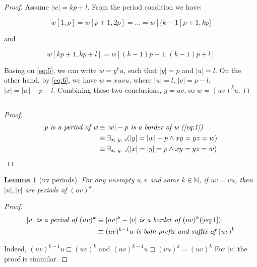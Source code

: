 \documentclass{scrartcl}
\newtheorem{lema}{Lemma}
\begin{document}
  \subsection{}
    \begin{proof}
      Assume $|w| = kp + l$. From the period condition we have:
      
      \begin{equation}\label{eq:5}
        w[1, p] = w[p + 1, 2p] = \dots = w[(k - 1]p + 1, kp]
      \end{equation}
      
      and
      
      \begin{equation}\label{eq:6}
        w[kp + 1, kp + l] = w[(k - 1)p + 1, (k - 1)p + l]
      \end{equation}
      
      Basing on \ref{eq:5}, we can write $w = y^ku$, such that $|y| = p$ and $|u| = l$. On the other hand, by \ref{eq:6}, we have $w = xuvu$, where $|u| = l$, $|v| = p - l$, $|x| = |w| - p - l$. Combining these two conclusions, $y = uv$, so $w = (uv)^ku$.
    \end{proof}
    
  \subsection{}
    \begin{proof}
      \begin{equation}
        \begin{split}
          \textit{p is a period of w} &\equiv |w| - p \textit{ is a border of w (\ref{eq:1})} \\ &\equiv  \exists_\textit{x, y, z}(|y| = |w| - p \land xy = yz = w) \\ &\equiv \exists_\textit{x, y, z}(|x| = |y| = p \land xy = yz = w)
        \end{split}
      \end{equation}
    \end{proof}
    
    \begin{lema}[uv periods]\label{lemma:10}
       For any unempty $u, v$ and some $k \in \mathbb{N}$, if $uv = vu$, then $|u|,|v|$ are periods of $(uv)^k$.
    \end{lema}
    \begin{proof}
      \begin{equation}
        \begin{split}
          |v| \textit{ is a period of } (uv)^k &\equiv |uv|^k - |v| \textit{ is a border of } (uv)^k 
          (\ref{eq:1}) \\ &\equiv (uv)^{k-1}u \textit{ is both prefix and suffix of } (uv)^k
        \end{split}
      \end{equation}
      
      Indeed, $(uv)^{k-1}u \sqsubset (uv)^k$ and $(uv)^{k-1}u \sqsupset (vu)^k = (uv)^k$ For $|u|$ the proof is simmilar.
    \end{proof}
    
\end{document}
